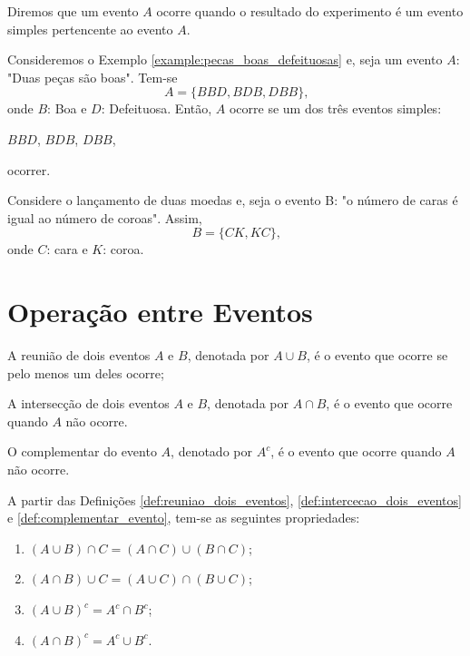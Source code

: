 \documentclass[11pt,fleqn]{book}
\numberwithin{mpicture}{chapter}
\numberwithin{mtable}{chapter}
\numberwithin{mframe}{chapter}
\begin{document}
\begin{remark}
	Diremos que um evento $A$ ocorre quando o resultado do experimento é um evento simples pertencente ao evento $A$.
\end{remark}

\begin{example}
	Consideremos o Exemplo \ref{example:pecas_boas_defeituosas} e, seja um evento $A$: "Duas peças são boas". Tem-se
	\[
		A=\{BBD, BDB, DBB\}\text{,}
	\]
	onde $B$: Boa e $D$: Defeituosa. Então, $A$ ocorre se um dos três eventos simples:
	\begin{center}
		$BBD$, $BDB$, $DBB$,
	\end{center}
	ocorrer.
\end{example}

\begin{example}
	Considere o lançamento de duas moedas e, seja o evento B: "o número de caras é igual ao número de coroas". Assim,
	\[
		B=\{CK, KC\}\text{,}
	\]
	onde $C$: cara e $K$: coroa.
\end{example}

\section{Operação entre Eventos}

\begin{definition}
	\label{def:reuniao_dois_eventos}
	A reunião de dois eventos $A$ e $B$, denotada por $A\cup B$, é o evento que ocorre se pelo menos um deles ocorre;
\end{definition}

\begin{definition}
	\label{def:intercecao_dois_eventos}
	A intersecção de dois eventos $A$ e $B$, denotada por $A\cap B$, é o evento que ocorre quando $A$ não ocorre.
\end{definition}

\begin{definition}
	\label{def:complementar_evento}
	O complementar do evento $A$, denotado por $A^{c}$, é o evento que ocorre quando $A$ não ocorre.
\end{definition}

\begin{theorem}
	A partir das Definições \ref{def:reuniao_dois_eventos}, \ref{def:intercecao_dois_eventos} e \ref{def:complementar_evento}, tem-se as seguintes propriedades:
	\begin{enumerate}
		\item $(A\cup B)\cap C = (A\cap C)\cup (B\cap C)$;
		\item $(A\cap B)\cup C = (A\cup C)\cap (B\cup C)$;
		\item $(A\cup B)^c = A^c \cap B^c$;
		\item $(A\cap B)^c= A^c\cup B^c$.
	\end{enumerate}
\end{theorem}
\end{document}
